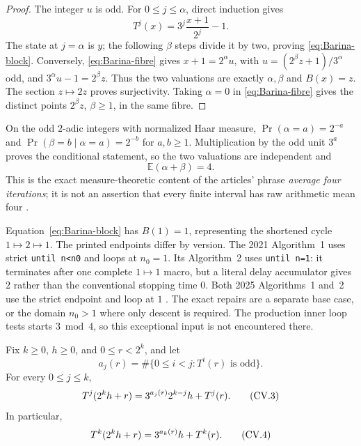 \begin{proof}
The integer $u$ is odd.  For $0\leq j\leq\alpha$, direct induction gives
\[
 T^j(x)=3^j\frac{x+1}{2^j}-1.
\]
The state at $j=\alpha$ is $y$; the following $\beta$ steps divide it by
two, proving \eqref{eq:Barina-block}.  Conversely,
\eqref{eq:Barina-fibre} gives $x+1=2^\alpha u$, with
$u=(2^\beta z+1)/3^\alpha$ odd, and
$3^\alpha u-1=2^\beta z$.  Thus the two valuations are exactly
$\alpha,\beta$ and $B(x)=z$.  The section $z\mapsto2z$ proves
surjectivity.  Taking $\alpha=0$ in \eqref{eq:Barina-fibre} gives the
distinct points $2^\beta z$, $\beta\geq1$, in the same fibre.
\end{proof}

On the odd $2$-adic integers with normalized Haar measure,
$\Pr(\alpha=a)=2^{-a}$ and
$\Pr(\beta=b\mid\alpha=a)=2^{-b}$ for $a,b\geq1$.  Multiplication by the
odd unit $3^a$ proves the conditional statement, so the two valuations are
independent and
\[
 \mathbb E(\alpha+\beta)=4.
\]
This is the exact measure-theoretic content of the articles' phrase
\emph{average four iterations}; it is not an assertion that every finite
interval has raw arithmetic mean four \cite[pp.~3--5]{Barina2021}.

\begin{sourceissue}
\label{sourceissue:Barina-one-endpoints}
Equation~\eqref{eq:Barina-block} has $B(1)=1$, representing the shortened
cycle $1\mapsto2\mapsto1$.  The printed endpoints differ by version.  The
2021 Algorithm~1 uses strict \texttt{until n<n0} and loops at $n_0=1$.
Its Algorithm~2 uses \texttt{until n=1}: it terminates after one complete
$1\mapsto1$ macro, but a literal delay accumulator gives $2$ rather than
the conventional stopping time $0$.  Both 2025 Algorithms~1 and~2 use the
strict endpoint and loop at $1$ \cite[pp.~4--5]{Barina2021}
\cite[pp.~4--5]{Barina2025}.  The exact repairs are a separate base case, or
the domain $n_0>1$ where only descent is required.  The production inner
loop tests starts $3\bmod4$, so this exceptional input is not encountered
there.
\end{sourceissue}

\begin{proposition}
\label{prop:computational-dyadic-prefix}
Fix $k\geq0$, $h\geq0$, and $0\leq r<2^k$, and let
\[
 a_j(r)=\#\{0\leq i<j:T^i(r)\text{ is odd}\}.
\]
For every $0\leq j\leq k$,
\begin{equation}
\stepcounter{equation}
\label{eq:computational-dyadic-prefix}
 T^j(2^kh+r)=3^{a_j(r)}2^{k-j}h+T^j(r).
\tag{CV.3}
\end{equation}
In particular,
\begin{equation}
\stepcounter{equation}
\label{eq:computational-dyadic-endpoint}
 T^k(2^kh+r)=3^{a_k(r)}h+T^k(r).
\tag{CV.4}
\end{equation}
\end{proposition}

